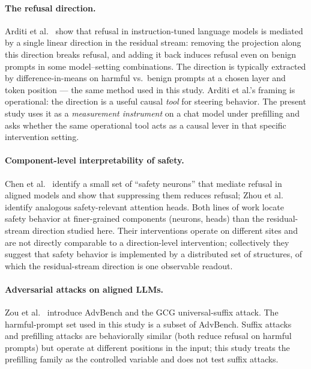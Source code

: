 \documentclass{article}
\begin{document}
\paragraph{The refusal direction.}
Arditi et al.~\cite{arditi2024refusal} show that refusal in instruction-tuned
language models is mediated by a single linear direction in the
residual stream: removing the projection along this direction breaks
refusal, and adding it back induces refusal even on benign prompts in
some model--setting combinations. The direction is typically extracted by
difference-in-means on harmful vs.\ benign prompts at a chosen layer
and token position --- the same method used in this study. Arditi
et al.'s framing is operational: the direction is a useful causal
\emph{tool} for steering behavior. The present study uses it as a
\emph{measurement instrument} on a chat model under prefilling and asks
whether the same operational tool acts as a causal lever in that
specific intervention setting.

\paragraph{Component-level interpretability of safety.}
Chen et al.~\cite{chen2025safetyneurons} identify a small set of
``safety neurons'' that mediate refusal in aligned models and show that
suppressing them reduces refusal; Zhou et al.~\cite{zhou2025safetyheads}
identify analogous safety-relevant attention heads. Both lines of work
locate safety behavior at finer-grained components (neurons, heads)
than the residual-stream direction studied here. Their interventions
operate on different sites and are not directly comparable to a
direction-level intervention; collectively they suggest that safety
behavior is implemented by a distributed set of structures, of which
the residual-stream direction is one observable readout.

\paragraph{Adversarial attacks on aligned LLMs.}
Zou et al.~\cite{zou2023advbench} introduce AdvBench and the GCG
universal-suffix attack. The harmful-prompt set used in this study is a
subset of AdvBench. Suffix attacks and prefilling attacks are
behaviorally similar (both reduce refusal on harmful prompts) but
operate at different positions in the input; this study treats the
prefilling family as the controlled variable and does not test suffix
attacks.
\end{document}
